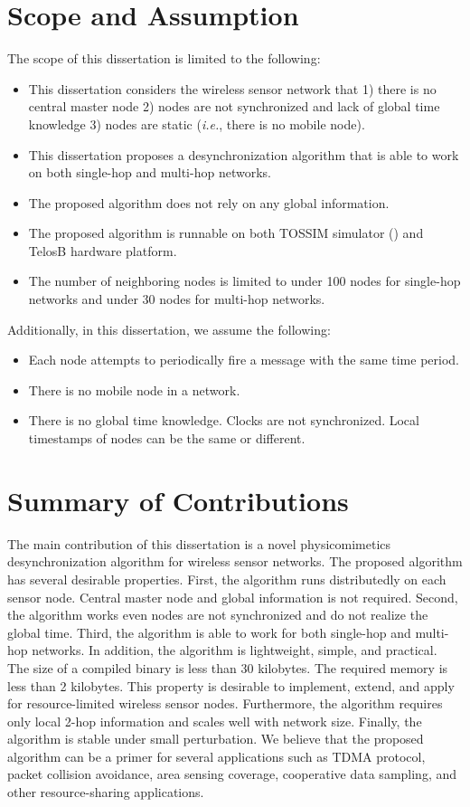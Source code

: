 \section{Scope and Assumption}
\label{sec:assump}
The scope of this dissertation is limited to the following:
\begin{itemize}
\item This dissertation considers the wireless sensor network that 1) there is no central master node 2) nodes are not synchronized and lack of global time knowledge 3) nodes are static (\textit{i.e.}, there is no mobile node). 
\item This dissertation proposes a desynchronization algorithm that is able to work on both single-hop and multi-hop networks.
\item The proposed algorithm does not rely on any global information.
\item The proposed algorithm is runnable on both TOSSIM simulator (\cite{levis-tossim-03}) and TelosB hardware platform.
\item The number of neighboring nodes is limited to under 100 nodes for single-hop networks and under 30 nodes for multi-hop networks. 
\end{itemize}

Additionally, in this dissertation, we assume the following:
\begin{itemize}
\item Each node attempts to periodically fire a message with the same time period.
\item There is no mobile node in a network. 
\item There is no global time knowledge. Clocks are not synchronized. Local timestamps of nodes can be the same or different.
\end{itemize}

\section{Summary of Contributions}
\label{sec:intro_contribution}
The main contribution of this dissertation is a novel physicomimetics desynchronization algorithm for wireless sensor networks. The proposed algorithm has several desirable properties. First, the algorithm runs distributedly on each sensor node. Central master node and global information is not required. Second, the algorithm works even nodes are not synchronized and do not realize the global time. Third, the algorithm is able to work for both single-hop and multi-hop networks. In addition, the algorithm is lightweight, simple, and practical. The size of a compiled binary is less than 30 kilobytes. The required memory is less than 2 kilobytes. This property is desirable to implement, extend, and apply for resource-limited wireless sensor nodes. Furthermore, the algorithm requires only local 2-hop information and scales well with network size. Finally, the algorithm is stable under small perturbation. We believe that the proposed algorithm can be a primer for several applications such as TDMA protocol, packet collision avoidance, area sensing coverage, cooperative data sampling, and other resource-sharing applications.

